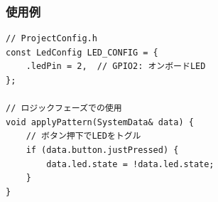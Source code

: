 \subsubsection{使用例}

\begin{lstlisting}[style=cppstyle, caption={LedModuleの使用例}]
// ProjectConfig.h
const LedConfig LED_CONFIG = {
    .ledPin = 2,  // GPIO2: オンボードLED
};

// ロジックフェーズでの使用
void applyPattern(SystemData& data) {
    // ボタン押下でLEDをトグル
    if (data.button.justPressed) {
        data.led.state = !data.led.state;
    }
}
\end{lstlisting}
